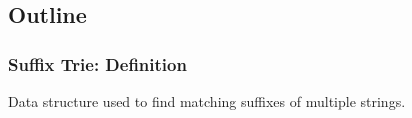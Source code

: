 \subsection{Outline}
\begin{frame}
  \frametitle{Suffix Trie: Definition}

  {\smaller
    \begin{block}{}
      Data structure used to find matching suffixes of multiple strings.
    \end{block}

    \vfill

    \begin{center}
    \end{center}

    \vfill

}
\end{frame}
